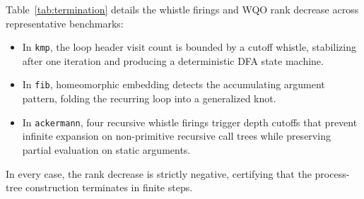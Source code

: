 Table~\ref{tab:termination} details the whistle firings and WQO rank decrease across representative benchmarks:
\begin{itemize}
    \item In \texttt{kmp}, the loop header visit count is bounded by a cutoff whistle, stabilizing after one iteration and producing a deterministic DFA state machine.
    \item In \texttt{fib}, homeomorphic embedding detects the accumulating argument pattern, folding the recurring loop into a generalized knot.
    \item In \texttt{ackermann}, four recursive whistle firings trigger depth cutoffs that prevent infinite expansion on non-primitive recursive call trees while preserving partial evaluation on static arguments.
\end{itemize}
In every case, the rank decrease is strictly negative, certifying that the process-tree construction terminates in finite steps.
